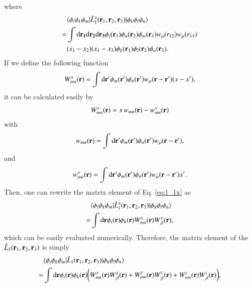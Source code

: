 \documentclass[aip,jcp,reprint,noshowkeys,superscriptaddress]{revtex4-1}
\newcommand{\matelem}[3]{\langle #1 | #2 | #3 \rangle}
\newcommand{\bri}[1]{{\bf r}_{#1}}
\newcommand{\dr}[1]{\text{d}{\bf r_{#1}}}
\begin{document}
where 
\begin{equation}
 \begin{aligned}
 \label{eq:l_1x}
& \matelem{\phi_i \phi_k \phi_m}{\hat{L}_1^x(\bri{1},\bri{2},\bri{3})}{\phi_k \phi_l \phi_n} \\  
 = & \int \dr{1} \dr{2} \dr{3} \phi_i(\bri{1}) \phi_u(\bri{2}) \phi_m(\bri{3}) w_{\mu}(r_{12}) w_{\mu}(r_{13}) \\ 
 &(x_1 - x_2) (x_1 - x_3) \phi_k(\bri{1}) \phi_l(\bri{2}) \phi_n(\bri{3}).
 \end{aligned}
\end{equation}
If we define the following function 
\begin{equation}
 W_{mn}^x({\bf r})  = \int \text{d}{\bf r'} \phi_m({\bf r}') \phi_n({\bf r}') w_{\mu}({\bf r} - {\bf r'}) (x - x'),  
\end{equation}
it can be calculated easily by
\begin{equation}
 W_{mn}^x({\bf r})  = x \, w_{mn}({\bf r}) - w_{mn}^x({\bf r})
\end{equation}
with 
\begin{equation}
 w_{mn}({\bf r}) = \int \text{d}{\bf r'} \phi_m({\bf r}') \phi_n({\bf r}') w_{\mu}({\bf r} - {\bf r'}), 
\end{equation}
and 
\begin{equation}
  w_{mn}^x({\bf r}) = \int \text{d}{\bf r'} \phi_m({\bf r}') \phi_n({\bf r}') w_{\mu}({\bf r} - {\bf r'})  x'.
\end{equation}
Then, one can rewrite the matrix element of Eq. \eqref{eq:l_1x} as
\begin{equation}
 \begin{aligned}
 \label{eq:l_1x_2}
& \matelem{\phi_i \phi_k \phi_m}{\hat{L}_1^x(\bri{1},\bri{2},\bri{3})}{\phi_k \phi_l \phi_n} \\  
 = & \int \text{d}{\bf r} \phi_i({\bf r})  \phi_k({\bf r}) W_{mn}^x({\bf r}) W_{jl}^x({\bf r}),
 \end{aligned}
\end{equation}
which can be easily evaluated numerically. 
Therefore, the matrix element of the $\hat{L}_1(\bri{1},\bri{2},\bri{3})$ is simply 
\begin{equation}
 \begin{aligned}
 & \matelem{\phi_i \phi_k \phi_m}{\hat{L}_1(\bri{1},\bri{2},\bri{3})}{\phi_k \phi_l \phi_n} \\
 = & \int \text{d}{\bf r} \phi_i({\bf r})  \phi_k({\bf r}) \bigg( W_{mn}^x({\bf r}) W_{jl}^x({\bf r}) + W_{mn}^y({\bf r}) W_{jl}^y({\bf r}) + W_{mn}^z({\bf r}) W_{jl}^z({\bf r})\bigg),
 \end{aligned}
\end{equation}
\end{document}
